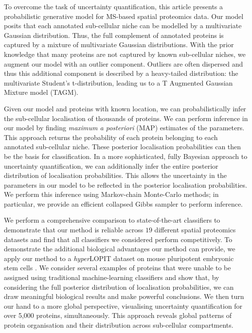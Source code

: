 \documentclass[10pt,letterpaper]{article}\usepackage[]{graphicx}\usepackage[]{color}
\begin{document}
To overcome the task of uncertainty quantification, this article
presents a probabilistic generative model for MS-based spatial
proteomics data. Our model posits that each annotated sub-cellular
niche can be modelled by a multivariate Gaussian distribution. Thus,
the full complement of annotated proteins is captured by a mixture of
multivariate Gaussian distributions. With the prior knowledge that
many proteins are not captured by known sub-cellular niches, we
augment our model with an outlier component. Outliers are often
dispersed and thus this additional component is described by a
heavy-tailed distribution: the multivariate Student's t-distribution,
leading us to a T Augmented Gaussian Mixture model (TAGM).

Given our model and proteins with known location, we can
probabilistically infer the sub-cellular localisation of thousands of
proteins. We can perform inference in our model by finding
\textit{maximum a posteriori} (MAP) estimates of the parameters. This
approach returns the probability of each protein belonging to each
annotated sub-cellular niche. These posterior localisation
probabilities can then be the basis for classification. In a more
sophisticated, fully Bayesian approach to uncertainty quantification,
we can additionally infer the entire posterior distribution of
localisation probabilities. This allows the uncertainty in the
parameters in our model to be reflected in the posterior localisation
probabilities. We perform this inference using Markov-chain
Monte-Carlo methods; in particular, we provide an efficient collapsed
Gibbs sampler to perform inference.

We perform a comprehensive comparison to state-of-the-art classifiers
to demonstrate that our method is reliable across $19$ different
spatial proteomics datasets and find that all classifiers we
considered perform competitively. To demonstrate the additional
biological advantages our method can provide, we apply our method to a
\textit{hyper}LOPIT dataset on mouse pluripotent embryonic stem cells
\cite{hyper}. We consider several examples of proteins that were
unable to be assigned using traditional machine-learning classifiers
and show that, by considering the full posterior distribution of
localisation probabilities, we can draw meaningful biological results
and make powerful conclusions. We then turn our hand to a more global
perspective, visualising uncertainty quantification for over 5,000
proteins, simultaneously. This approach reveals global patterns of
protein organisation and their distribution across sub-cellular
compartments.
\end{document}

